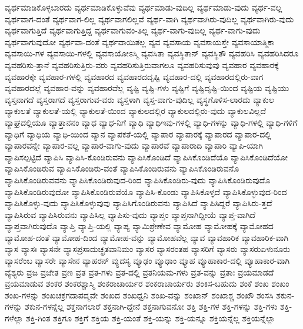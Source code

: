 {ವ್ಯರ್ಥಮಾಡಿಕೊಳ್ಳಬಾರದು
ವ್ಯರ್ಥಮಾಡಿಕೊಳ್ಳುವೆವು
ವ್ಯರ್ಥಮಾಡು-ವುದಿಲ್ಲ
ವ್ಯರ್ಥಮಾಡು-ವುದು
ವ್ಯರ್ಥ-ವಲ್ಲ
ವ್ಯರ್ಥವಾಗ-ದಂತೆ
ವ್ಯರ್ಥವಾಗ-ಲಿಲ್ಲ
ವ್ಯರ್ಥವಾಗಲಿಲ್ಲವೆ
ವ್ಯರ್ಥ-ವಾಗಿ
ವ್ಯರ್ಥವಾಗಿರು-ವುದಿಲ್ಲ
ವ್ಯರ್ಥವಾಗಿರು-ವುದು
ವ್ಯರ್ಥವಾಗುತ್ತಿದೆ
ವ್ಯರ್ಥವಾಗುತ್ತಿದ್ದ
ವ್ಯರ್ಥವಾಗುವಂ-ತಿಲ್ಲ
ವ್ಯರ್ಥ-ವಾಗು-ವುದಿಲ್ಲ
ವ್ಯರ್ಥ-ವಾಗು-ವುದು
ವ್ಯರ್ಥವಾಗುವುದೋ
ವ್ಯರ್ಥವಾ-ದಂತೆ
ವ್ಯರ್ಥವಾಯಿತಲ್ಲ
ವ್ಯವ
ವ್ಯವಸಾಯ
ವ್ಯವಸಾಯಸ್ತೇ
ವ್ಯವಸಾಯಾತ್ಮಿಕಾ
ವ್ಯವಸಾಯಿ-ಗಳ
ವ್ಯವಸಾಯಿ-ಗಳಲ್ಲಿ
ವ್ಯವಸಾಯೋಽಸ್ಮಿ
ವ್ಯವಸಿತಾ
ವ್ಯವಸ್ಥಿತಾನ್
ವ್ಯವಸ್ಥಿತೌ
ವ್ಯವಹರಿಸಿ
ವ್ಯವಹರಿಸಿದರೂ
ವ್ಯವಹರಿಸು-ತ್ತಾನೆ
ವ್ಯವಹರಿಸುತ್ತಿರು-ವರು
ವ್ಯವಹರಿಸುತ್ತಿರುವಾಗಲೂ
ವ್ಯವಹರಿಸುವುವು
ವ್ಯವಹಾರ
ವ್ಯವಹಾರಕ್ಕೆ
ವ್ಯವಹಾರಕ್ಕೇ
ವ್ಯವಹಾರ-ಗಳಲ್ಲಿ
ವ್ಯವಹಾರದ
ವ್ಯವಹಾರದದೃಷ್ಟಿ
ವ್ಯವಹಾರ-ದಲ್ಲಿ
ವ್ಯವಹಾರದಲ್ಲಿರು-ವಾಗ
ವ್ಯವಹಾರದಲ್ಲೆ
ವ್ಯವಹಾರ-ವನ್ನು
ವ್ಯವಹಾರವೆಲ್ಲ
ವ್ಯಷ್ಟಿ
ವ್ಯಷ್ಟಿ-ಗಳು
ವ್ಯಷ್ಟಿಗೆ
ವ್ಯಷ್ಟಿದೃಷ್ಟಿ-ಯಿಂದ
ವ್ಯಷ್ಟಿಯ
ವ್ಯಷ್ಟಿಯು
ವ್ಯಸ್ತನಾಗದೆ
ವ್ಯಸ್ತರಾಗದೆ
ವ್ಯಸ್ತರಾಗುವ-ವರು
ವ್ಯಸ್ತಳಾಗಿ
ವ್ಯಸ್ತ-ವಾಗು-ವುದಿಲ್ಲ
ವ್ಯಸ್ಥಗೊಳಿಸ-ಲಾರದು
ವ್ಯಾಕುಲ
ವ್ಯಾಕುಲತೆ
ವ್ಯಾಕುಲತೆ-ಯಲ್ಲಿ
ವ್ಯಾಕುಲತೆ-ಯಿಂದ
ವ್ಯಾಕುಲದಲ್ಲಿರ
ವ್ಯಾಕುಲದಲ್ಲಿರು-ವುದು
ವ್ಯಾಕುಲವಿಲ್ಲದೆ
ವ್ಯಾಘ್ರದಲ್ಲಿಯೂ
ವ್ಯಾತ್ತಾನನಂ
ವ್ಯಾಧ
ವ್ಯಾಧ-ನಿಗೆ
ವ್ಯಾಧಿ
ವ್ಯಾಧಿಇವು-ಗಳಲ್ಲಿ
ವ್ಯಾಧಿ-ಗಳನ್ನು
ವ್ಯಾಧಿ-ಗಳಲ್ಲಿ
ವ್ಯಾಧಿ-ಗಳಿಗೆ
ವ್ಯಾಧಿಗೆ
ವ್ಯಾಧಿಯ
ವ್ಯಾಧಿ-ಯಿಂದ
ವ್ಯಾನ
ವ್ಯಾಪಕತೆ-ಯಲ್ಲಿ
ವ್ಯಾಪಾರ
ವ್ಯಾಪಾರಕ್ಕೆ
ವ್ಯಾಪಾರದ
ವ್ಯಾಪಾರ-ದಲ್ಲಿ
ವ್ಯಾಪಾರವನ್ನೇ
ವ್ಯಾಪಾರ-ವಲ್ಲ
ವ್ಯಾಪಾರ-ವಾಗು-ವುದು
ವ್ಯಾಪಾರವೆ
ವ್ಯಾಪಾರಾದಿ
ವ್ಯಾಪಾರಿ
ವ್ಯಾಪಿ-ಯಾಗಿ
ವ್ಯಾಪಿಸಲ್ಪಟ್ಟಿದೆ
ವ್ಯಾಪಿಸಿ
ವ್ಯಾಪಿಸಿ-ಕೊಂಡಿರುವನು
ವ್ಯಾಪಿಸಿಕೊಂಡಿದೆ
ವ್ಯಾಪಿಸಿಕೊಂಡಿದೆಯೊ
ವ್ಯಾಪಿಸಿಕೊಂಡಿದೆಯೋ
ವ್ಯಾಪಿಸಿಕೊಂಡಿರುವ
ವ್ಯಾಪಿಸಿಕೊಂಡಿರು-ವಂತೆ
ವ್ಯಾಪಿಸಿಕೊಂಡಿರುವನು
ವ್ಯಾಪಿಸಿಕೊಂಡಿರುವನೊ
ವ್ಯಾಪಿಸಿಕೊಂಡಿರುವವನು
ವ್ಯಾಪಿಸಿಕೊಂಡಿರುವುದ-ರಿಂದ
ವ್ಯಾಪಿಸಿಕೊಂಡಿರು-ವುದು
ವ್ಯಾಪಿಸಿಕೊಂಡಿರುವುದೊ
ವ್ಯಾಪಿಸಿಕೊಂಡಿರುವುದೋ
ವ್ಯಾಪಿಸಿಕೊಂಡಿರುವೆಯೊ
ವ್ಯಾಪಿಸಿ-ಕೊಂಡು
ವ್ಯಾಪಿಸಿಕೊಳ್ಳದೆ
ವ್ಯಾಪಿಸಿಕೊಳ್ಳುವುದ-ರಿಂದ
ವ್ಯಾಪಿಸಿಕೊಳ್ಳು-ವುದು
ವ್ಯಾಪಿಸಿಕೊಳ್ಳುವುವು
ವ್ಯಾಪಿಸಿಗೊಂಡಿರುವನು
ವ್ಯಾಪಿಸಿದೆ
ವ್ಯಾಪಿಸಿದ್ದರೆ
ವ್ಯಾಪಿಸಿರು-ತ್ತದೆ
ವ್ಯಾಪಿಸಿರುವ
ವ್ಯಾಪಿಸಿರುವನು
ವ್ಯಾಪಿಸಿಲ್ಲ
ವ್ಯಾಪಿಸು-ವುದು
ವ್ಯಾಪ್ತಂ
ವ್ಯಾಪ್ತನಾಗಿದ್ದೀಯೆ
ವ್ಯಾಪ್ತ-ವಾಗಿದೆ
ವ್ಯಾಪ್ತವಾಗಿರುವುದೊ
ವ್ಯಾಪ್ತಿ
ವ್ಯಾಪ್ತಿ-ಯಲ್ಲಿ
ವ್ಯಾಪ್ಯ
ವ್ಯಾಮಿಶ್ರೇಣೇವ
ವ್ಯಾಮೋಹ
ವ್ಯಾಮೋಹಕ್ಕೆ
ವ್ಯಾಮೋಹದ
ವ್ಯಾಮೋಹ-ದಂತೆ
ವ್ಯಾಮೋಹ-ದಿಂದ
ವ್ಯಾಮೋಹ-ವನ್ನು
ವ್ಯಾಮೋಹವೆಲ್ಲ
ವ್ಯಾವ
ವ್ಯಾವಹಾರಿಕ
ವ್ಯಾವಹಾರಿಕ-ವಾಗಿ
ವ್ಯಾಸ
ವ್ಯಾಸಃ
ವ್ಯಾಸನೇ
ವ್ಯಾಸಪ್ರಸಾದುಚ್ಛ್ರತವಾನಿಮಂ
ವ್ಯಾಸರ
ವ್ಯಾಸರಂತಹ
ವ್ಯಾಸರಿಗೆ
ವ್ಯಾಸರು
ವ್ಯಾಸರುಏಳುನೂರು
ವ್ಯಾಸರೆಂಬ
ವ್ಯಾಸರೇ
ವ್ಯಾಸೇನ
ವ್ಯಾಹರನ್
ವ್ಯುದಸ್ಯ
ವ್ಯೂಢಂ
ವ್ಯೂಢಾಂ
ವ್ಯೂಹ
ವ್ಯೂಹಾಕಾರ-ದಲ್ಲಿ
ವ್ಯೂಹಾಕಾರ-ವಾಗಿ
ವ್ಯೆಶ್ಯರು
ವ್ರಜ
ವ್ರಜೇತ
ವ್ರಣ
ವ್ರತ
ವ್ರತ-ಗಳು
ವ್ರತ-ದಲ್ಲಿ
ವ್ರತನಿಯಮ-ಗಳು
ವ್ರತ-ವನ್ನು
ವ್ರತಾಃ
ವ್ರಯಮಾಡದೆ
ವ್ರಯಮಾಡುವ
ಶಂಕರ
ಶಂಕರಶ್ಚಾಸ್ಮಿ
ಶಂಕರಾಚಾರ್ಯರ
ಶಂಕರಾಚಾರ್ಯರು
ಶಂಕಿಸ-ಬಹುದು
ಶಂಕೆ
ಶಂಖ
ಶಂಖಂ
ಶಂಖ-ಗಳನ್ನು
ಶಂಖಚಕ್ರಗದಾಪದ್ಮವೇ
ಶಂಖದ
ಶಂಖಧ್ವನಿ
ಶಂಖ-ವನ್ನು
ಶಂಖಾನ್
ಶಂಖಾಶ್ಚ
ಶಂಖೌ
ಶಂಸಸಿ
ಶಕುನ-ಗಳನ್ನು
ಶಕುನ-ಗಳನ್ನೆಲ್ಲ
ಶಕ್ತನಾಗಲಾರೆ
ಶಕ್ತನಾಗಿ-ದ್ದೇನೆ
ಶಕ್ತನಾಗುವನೋ
ಶಕ್ತಿ
ಶಕ್ತಿ-ಗಳ
ಶಕ್ತಿ-ಗಳನ್ನು
ಶಕ್ತಿ-ಗಳು
ಶಕ್ತಿ-ಗಳೆಲ್ಲಾ
ಶಕ್ತಿ-ಗಿಂತ
ಶಕ್ತಿಗೂ
ಶಕ್ತಿಗೆ
ಶಕ್ತಿಯ
ಶಕ್ತಿ-ಯಂತೆ
ಶಕ್ತಿ-ಯನ್ನು
ಶಕ್ತಿ-ಯನ್ನೂ
ಶಕ್ತಿಯನ್ನೆಲ್ಲ
ಶಕ್ತಿಯನ್ನೆಲ್ಲಾ
}
